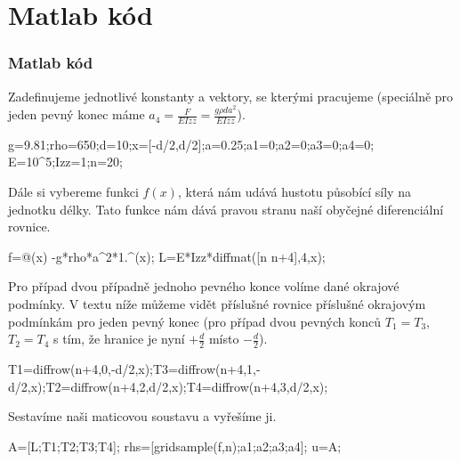 \documentclass{beamer}
\begin{document}
	\section*{Matlab kód}
\label{sec:xxxx}
\begin{frame}[fragile]
	\frametitle{Matlab kód}
	{\tiny
		Zadefinujeme jednotlivé konstanty a vektory, se kterými pracujeme (speciálně pro jeden pevný konec máme $a_4=\frac{F}{EIzz}=\frac{g\rho d a^2}{EIzz}$).
		\begin{verbatim*}
			g=9.81;rho=650;d=10;x=[-d/2,d/2];a=0.25;a1=0;a2=0;a3=0;a4=0;
			E=10^5;Izz=1;n=20;
		\end{verbatim*}
		Dále si vybereme funkci $f(x)$, která nám udává hustotu působící síly na jednotku délky. Tato funkce nám dává pravou stranu naší obyčejné diferenciální rovnice.
		\begin{verbatim*}
			f=@(x) -g*rho*a^2*1.^(x);
			L=E*Izz*diffmat([n n+4],4,x);
		\end{verbatim*}
		Pro případ dvou případně jednoho pevného konce volíme dané okrajové podmínky. V textu níže můžeme vidět příslušné rovnice příslušné okrajovým podmínkám pro jeden pevný konec (pro případ dvou pevných konců $T_1=T_3$,$T_2=T_4$ s tím, že hranice je nyní $+\frac{d}{2}$ místo $-\frac{d}{2}$).
		\begin{verbatim*}
			T1=diffrow(n+4,0,-d/2,x);T3=diffrow(n+4,1,-d/2,x);T2=diffrow(n+4,2,d/2,x);T4=diffrow(n+4,3,d/2,x);
		\end{verbatim*}
		Sestavíme naši maticovou soustavu a vyřešíme ji.
		\begin{verbatim*}
			A=[L;T1;T2;T3;T4];
			rhs=[gridsample(f,n);a1;a2;a3;a4];
			u=A\rhs;
		\end{verbatim*}
	}
\end{frame}
\end{document}
